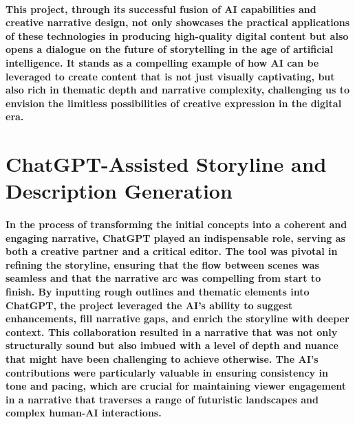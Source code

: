 \documentclass[11pt,a4paper,oneside]{report}
\begin{document}
\paragraph{This project, through its successful fusion of AI capabilities and creative narrative design, not only showcases the practical applications of these technologies in producing high-quality digital content but also opens a dialogue on the future of storytelling in the age of artificial intelligence. It stands as a compelling example of how AI can be leveraged to create content that is not just visually captivating, but also rich in thematic depth and narrative complexity, challenging us to envision the limitless possibilities of creative expression in the digital era.}

\section{ChatGPT-Assisted Storyline and Description Generation}

\paragraph{In the process of transforming the initial concepts into a coherent and engaging narrative, ChatGPT played an indispensable role, serving as both a creative partner and a critical editor. The tool was pivotal in refining the storyline, ensuring that the flow between scenes was seamless and that the narrative arc was compelling from start to finish. By inputting rough outlines and thematic elements into ChatGPT, the project leveraged the AI's ability to suggest enhancements, fill narrative gaps, and enrich the storyline with deeper context. This collaboration resulted in a narrative that was not only structurally sound but also imbued with a level of depth and nuance that might have been challenging to achieve otherwise. The AI's contributions were particularly valuable in ensuring consistency in tone and pacing, which are crucial for maintaining viewer engagement in a narrative that traverses a range of futuristic landscapes and complex human-AI interactions.}
\end{document}
